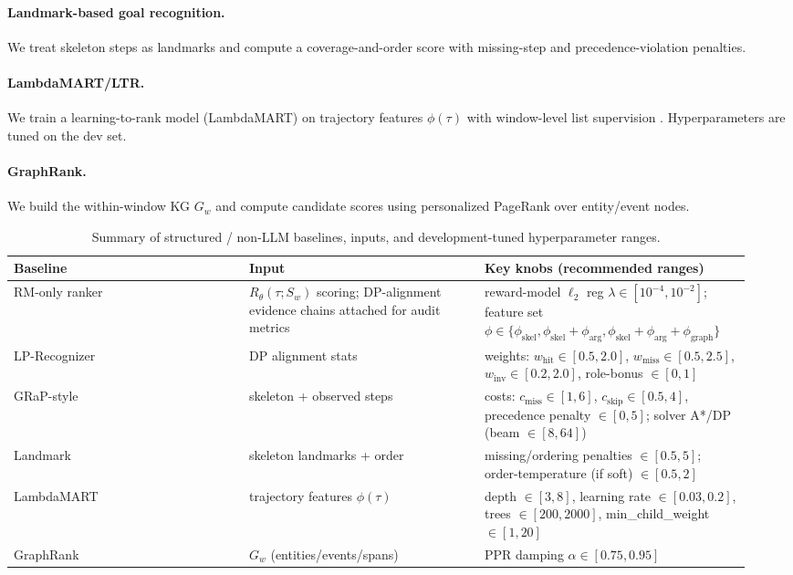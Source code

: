\documentclass{article}
\begin{document}
\paragraph{Landmark-based goal recognition.}
We treat skeleton steps as landmarks and compute a coverage-and-order score with missing-step and precedence-violation penalties.

\paragraph{LambdaMART/LTR.}
We train a learning-to-rank model (LambdaMART) on trajectory features $\phi(\tau)$ with window-level list supervision \citep{burges_ranknet_2010}.
Hyperparameters are tuned on the dev set.

\paragraph{GraphRank.}
We build the within-window KG $G_w$ and compute candidate scores using personalized PageRank over entity/event nodes.

\begin{table}[t]
\centering
\caption{Summary of structured / non-LLM baselines, inputs, and development-tuned hyperparameter ranges.}
\label{tab:baseline_impl_summary}
\small
\setlength{\tabcolsep}{4pt}
\begin{adjustbox}{max width=\linewidth}
\begin{tabular}{p{0.30\linewidth}p{0.30\linewidth}p{0.34\linewidth}}
\hline
Baseline & Input & Key knobs (recommended ranges) \\
\hline
RM-only ranker 
& $R_\theta(\tau;S_w)$ scoring; DP-alignment evidence chains attached for audit metrics 
& reward-model $\ell_2$ reg $\lambda\in[10^{-4},10^{-2}]$; feature set $\phi\in\{\phi_{\text{skel}},\phi_{\text{skel}}{+}\phi_{\text{arg}},\phi_{\text{skel}}{+}\phi_{\text{arg}}{+}\phi_{\text{graph}}\}$ \\
LP-Recognizer 
& DP alignment stats 
& weights: $w_{\text{hit}}\in[0.5,2.0]$, $w_{\text{miss}}\in[0.5,2.5]$, $w_{\text{inv}}\in[0.2,2.0]$, role-bonus $\in[0,1]$ \\
GRaP-style 
& skeleton + observed steps 
& costs: $c_{\text{miss}}\in[1,6]$, $c_{\text{skip}}\in[0.5,4]$, precedence penalty $\in[0,5]$; solver A*/DP (beam $\in[8,64]$) \\
Landmark 
& skeleton landmarks + order 
& missing/ordering penalties $\in[0.5,5]$; order-temperature (if soft) $\in[0.5,2]$ \\
LambdaMART 
& trajectory features $\phi(\tau)$ 
& depth $\in[3,8]$, learning rate $\in[0.03,0.2]$, trees $\in[200,2000]$, min\_child\_weight $\in[1,20]$ \\
GraphRank 
& $G_w$ (entities/events/spans) 
& PPR damping $\alpha\in[0.75,0.95]$ \\
\hline
\end{tabular}
\end{adjustbox}
\end{table}
\end{document}
